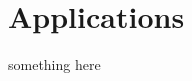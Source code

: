 \chapter{Applications}
\label{chap-application}
\begin{ChapAbstract}
something here
\end{ChapAbstract}

